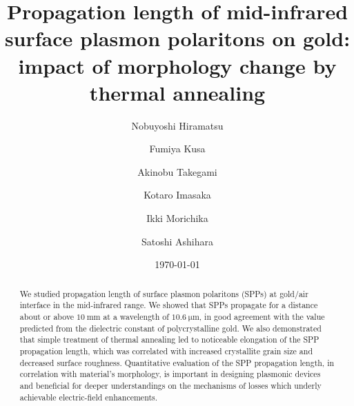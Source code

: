 \documentclass[aip,apl,reprint]{revtex4-1}
\begin{document}
\title{Propagation length of mid-infrared surface plasmon polaritons on gold: impact of morphology change by thermal annealing}
\author{Nobuyoshi Hiramatsu}
\author{Fumiya Kusa}
\author{Akinobu Takegami}
\author{Kotaro Imasaka}
\author{Ikki Morichika}
\author{Satoshi Ashihara}

\date{\today}

\begin{abstract}
We studied propagation length of surface plasmon polaritons (SPPs) at gold/air interface in the mid-infrared range. We showed that SPPs propagate for a distance about or above $10\:\mathrm{mm}$ at a wavelength of $10.6\:\mathrm{\mu m}$, in good agreement with the value predicted from the dielectric constant of polycrystalline gold. We also demonstrated that simple treatment of thermal annealing led to noticeable elongation of the SPP propagation length, which was correlated with increased crystallite grain size and decreased surface roughness. Quantitative evaluation of the SPP propagation length, in correlation with material's morphology, is important in designing plasmonic devices and beneficial for deeper understandings on the mechanisms of losses which underly achievable electric-field enhancements.
\end{abstract}

\maketitle
 
\end{document}
